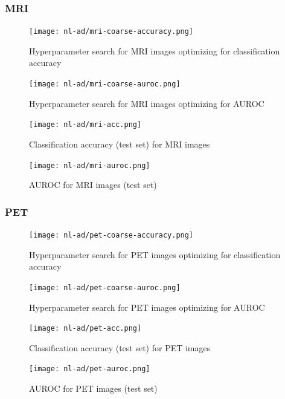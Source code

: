 \documentclass[12pt,a4paper]{article}
\begin{document}
\subsubsection{MRI}
\label{sec:mri}

\begin{figure}[H]
  \centering
  \texttt{[image: nl-ad/mri-coarse-accuracy.png]}
  \caption{\label{figaa:design}Hyperparameter search for MRI images
    optimizing for classification accuracy}
\end{figure}

\begin{figure}[H]
  \centering
  \texttt{[image: nl-ad/mri-coarse-auroc.png]}
  \caption{\label{fig:dbbesign}Hyperparameter search for MRI images
    optimizing for AUROC}
\end{figure}

\begin{figure}[H]
  \centering
  \texttt{[image: nl-ad/mri-acc.png]}
  \caption{\label{fig:desssign}Classification accuracy (test set) for MRI images}
\end{figure}

\begin{figure}[H]
  \centering
  \texttt{[image: nl-ad/mri-auroc.png]}
  \caption{\label{fig:desigggn}AUROC for MRI images (test set)}
\end{figure}

\subsubsection{PET}
\label{sec:pet}

\begin{figure}[H]
  \centering
  \texttt{[image: nl-ad/pet-coarse-accuracy.png]}
  \caption{\label{uufig:design}Hyperparameter search for PET images
    optimizing for classification accuracy}
\end{figure}

\begin{figure}[H]
  \centering
  \texttt{[image: nl-ad/pet-coarse-auroc.png]}
  \caption{\label{fiqeg:design}Hyperparameter search for PET images
    optimizing for AUROC}
\end{figure}

\begin{figure}[H]
  \centering
  \texttt{[image: nl-ad/pet-acc.png]}
  \caption{\label{fig:fsdhvdesign}Classification accuracy (test set) for PET images}
\end{figure}

\begin{figure}[H]
  \centering
  \texttt{[image: nl-ad/pet-auroc.png]}
  \caption{\label{fig:design}AUROC for PET images (test set)}
\end{figure}
\end{document}
